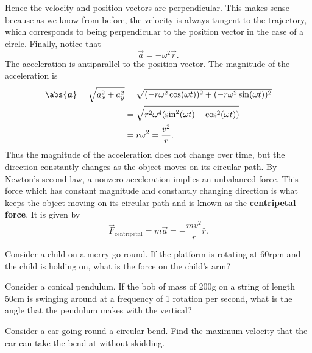 \documentclass[../classical_mechanics.tex]{subfiles}
\begin{document}
        Hence the velocity and position vectors are perpendicular.
        This makes sense because as we know from before, the velocity is always tangent to the trajectory, which corresponds to being perpendicular to the position vector in the case of a circle.
        Finally, notice that
        \begin{equation}
            \vec{a}=-\omega^2\vec{r}.
        \end{equation}
        The acceleration is antiparallel to the position vector.
        The magnitude of the acceleration is
        \begin{align}
            \abs{\vec{a}}=\sqrt{a_x^2+a_y^2}&=\sqrt{(-r\omega^2\cos(\omega t))^2+(-r\omega^2\sin(\omega t))^2}\\
            &=\sqrt{r^2\omega^4(\sin^2(\omega t)+\cos^2(\omega t))}\\
            &=r\omega^2=\frac{v^2}{r}.
        \end{align}
        Thus the magnitude of the acceleration does not change over time, but the direction constantly changes as the object moves on its circular path.
        By Newton's second law, a nonzero acceleration implies an unbalanced force.
        This force which has constant magnitude and constantly changing direction is what keeps the object moving on its circular path and is known as the \textbf{centripetal force}.
        It is given by
        \begin{equation}
            \vec{F}_\text{centripetal}=m\vec{a}=-\frac{mv^2}{r}\hat{r}.
        \end{equation}
        \begin{example}
            Consider a child on a merry-go-round.
            If the platform is rotating at 60rpm and the child is holding on, what is the force on the child's arm?
        \end{example}
        \begin{example}
            Consider a conical pendulum. 
            If the bob of mass of 200g on a string of length 50cm is swinging around at a frequency of 1 rotation per second, what is the angle that the pendulum makes with the vertical?
        \end{example}
        \begin{example}
            Consider a car going round a circular bend.
            Find the maximum velocity that the car can take the bend at without skidding.
        \end{example}
\end{document}
